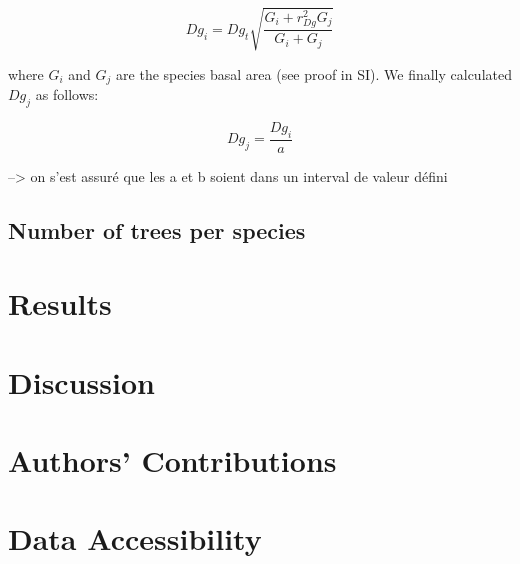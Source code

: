 \documentclass[a4paper]{article}
\begin{document}
\begin{enumerate}
  \begin{equation}\label{}
    Dg_i = Dg_t\sqrt{\frac{G_i + r_{Dg}^2G_j}{G_i + G_j}}
  \end{equation}

  where $G_i$ and $G_j$ are the species basal area (see proof in SI). We finally calculated $Dg_j$ as follows:

  \begin{equation}\label{}
    Dg_j = \frac{Dg_i}{a}
  \end{equation}

\end{enumerate}




--> on s'est assuré que les a et b soient dans un interval de valeur défini





\subsection*{Number of trees per species}





\section*{Results}

\section*{Discussion}


\section*{Authors' Contributions}

\section*{Data Accessibility}




\clearpage

\end{document}
